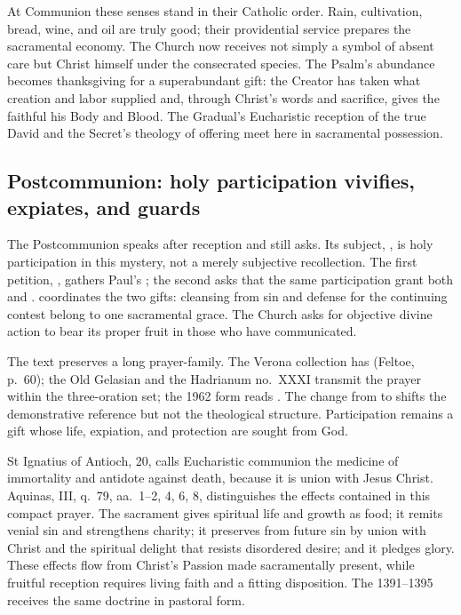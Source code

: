 At Communion these senses stand in their Catholic order. Rain, cultivation,
bread, wine, and oil are truly good; their providential service prepares the
sacramental economy. The Church now receives not simply a symbol of absent
care but Christ himself under the consecrated species. The Psalm's abundance
becomes thanksgiving for a superabundant gift: the Creator has taken what
creation and labor supplied and, through Christ's words and sacrifice, gives
the faithful his Body and Blood. The Gradual's Eucharistic reception of the
true David and the Secret's theology of offering meet here in sacramental
possession.

\elementguard
\subsection*{Postcommunion: holy participation vivifies, expiates, and guards }

The Postcommunion speaks after reception and still asks. Its subject,
, is holy participation in this
mystery, not a merely subjective recollection. The first petition,
, gathers Paul's ; the second asks
that the same participation grant both  and
.  coordinates the two gifts: cleansing from
sin and defense for the continuing contest belong to one sacramental grace.
The Church asks for objective divine action to bear its proper fruit in those
who have communicated.

The text preserves a long prayer-family. The Verona collection has
 (Feltoe, p.~60); the Old Gelasian and
the Hadrianum no.~XXXI transmit the prayer within the three-oration set; the
1962 form reads . The change from  to 
shifts the demonstrative reference but not the theological structure.
Participation remains a gift whose life, expiation, and protection are sought
from God.

St Ignatius of Antioch,  20, calls Eucharistic
communion the medicine of immortality and antidote against death, because it
is union with Jesus Christ. Aquinas,  III, q.~79, aa.~1--2, 4, 6, 8,
distinguishes the effects contained in this compact prayer. The sacrament gives
spiritual life and growth as food; it remits venial sin and strengthens
charity; it preserves from future sin by union with Christ and the spiritual
delight that resists disordered desire; and it pledges glory. These effects
flow from Christ's Passion made sacramentally present, while fruitful reception
requires living faith and a fitting disposition.
The  1391--1395 receives the same doctrine in pastoral form.

